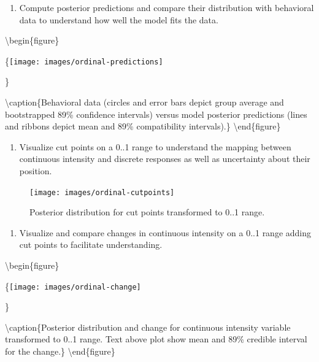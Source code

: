 \documentclass[
]{book}
\providecommand{\tightlist}{%
  \setlength{\itemsep}{0pt}\setlength{\parskip}{0pt}}
\begin{document}
\begin{enumerate}
\def\labelenumi{\arabic{enumi})}
\tightlist
\item
  Compute posterior predictions and compare their distribution with behavioral data to understand how well the model fits the data.
\end{enumerate}

\textbackslash begin\{figure\}

\{\centering \texttt{[image: images/ordinal-predictions]}

\}

\textbackslash caption\{Behavioral data (circles and error bars depict group average and bootstrapped 89\% confidence intervals) versus model posterior predictions (lines and ribbons depict mean and 89\% compatibility intervals).\}\label{fig:unnamed-chunk-85}
\textbackslash end\{figure\}

\begin{enumerate}
\def\labelenumi{\arabic{enumi})}
\setcounter{enumi}{1}
\tightlist
\item
  Visualize cut points on a 0..1 range to understand the mapping between continuous intensity and discrete responses as well as uncertainty about their position.
\end{enumerate}

\begin{figure}

{\centering \texttt{[image: images/ordinal-cutpoints]} 

}

\caption{Posterior distribution for cut points transformed to 0..1 range.}\label{fig:unnamed-chunk-86}
\end{figure}

\begin{enumerate}
\def\labelenumi{\arabic{enumi})}
\setcounter{enumi}{2}
\tightlist
\item
  Visualize and compare changes in continuous intensity on a 0..1 range adding cut points to facilitate understanding.
\end{enumerate}

\textbackslash begin\{figure\}

\{\centering \texttt{[image: images/ordinal-change]}

\}

\textbackslash caption\{Posterior distribution and change for continuous intensity variable transformed to 0..1 range. Text above plot show mean and 89\% credible interval for the change.\}\label{fig:unnamed-chunk-87}
\textbackslash end\{figure\}

  
\end{document}
